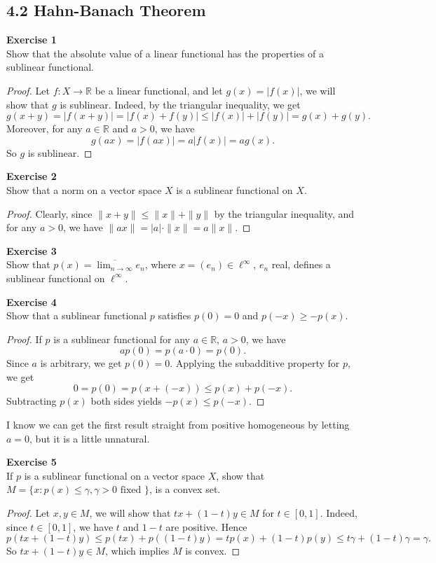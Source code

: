 \documentclass[12pt, a4paper]{article}
\theoremstyle{plain}
\newcommand{\R}{\mathbb{R}}
\newenvironment{exercise}[2][Exercise]
    { \begin{mdframed}[backgroundcolor=gray!20] \textbf{#1 #2} \\}
    {  \end{mdframed}}
\begin{document}
\subsection*{4.2 Hahn-Banach Theorem}
\begin{exercise}{1}
Show that the absolute value of a linear functional has the properties of a sublinear functional.
\end{exercise}
	\begin{proof}
	Let $f:X\rightarrow \R$ be a linear functional, and let $g(x) = |f(x)|$, we will show that $g$ is sublinear. Indeed, by the triangular inequality, we get
	\[
	g(x+y) = |f(x+y)| = |f(x)+f(y)|\leq |f(x)|+|f(y)|=g(x)+g(y).
	\]
	Moreover, for any $a\in \R$ and $a>0$, we have
	\[
	g(ax) = |f(ax)|=a|f(x)|=ag(x).
	\]
	So $g$ is sublinear.
	\end{proof}

\begin{exercise}{2}
Show that a norm on a vector space $X$ is a sublinear functional on $X$.
\end{exercise}
	\begin{proof}
	Clearly, since $\|x+y\|\leq \|x\|+\|y\|$ by the triangular inequality, and for any $a>0$, we have $\|ax\|=|a|\cdot \|x\|=a\|x\|$.
	\end{proof}
	
\pagebreak

\begin{exercise}{3}
Show that $p(x)=\overline{\lim_{n\rightarrow \infty}}e_n$, where $x=(e_n)\in\ell^\infty$, $e_n$ real, defines a sublinear functional on $\ell^\infty$.
\end{exercise}
	
\begin{exercise}{4}
Show that a sublinear functional $p$ satisfies $p(0)=0$ and $p(-x)\geq -p(x)$.
\end{exercise}
	\begin{proof}
	If $p$ is a sublinear functional for any $a\in \R$, $a>0$, we have
	\[
	ap(0) = p(a\cdot 0) = p(0).
	\]
	Since $a$ is arbitrary, we get $p(0)=0$. Applying the subadditive property for $p$, we get
	\[
	0 = p(0) = p(x+(-x))\leq p(x)+p(-x).
	\]
	Subtracting $p(x)$ both sides yields $-p(x)\leq p(-x)$.
	\end{proof}
I know we can get the first result straight from positive homogeneous by letting $a = 0$, but it is a little unnatural.

\begin{exercise}{5}
If $p$ is a sublinear functional on a vector space $X$, show that $M=\{x:p(x)\leq \gamma,\gamma >0 \text{ fixed }\}$, is a convex set.
\end{exercise}
	\begin{proof}
	Let $x,y\in M$, we will show that $tx + (1-t)y\in M$ for $t\in [0,1]$. Indeed, since $t\in [0,1]$, we have $t$ and $1-t$ are positive. Hence
	\[
	p(tx + (1-t)y)\leq p(tx)+p((1-t)y) = tp(x)+(1-t)p(y)\leq t\gamma + (1-t)\gamma = \gamma.
	\]
	So $tx + (1-t)y\in M$, which implies $M$ is convex.
	\end{proof}
\end{document}

